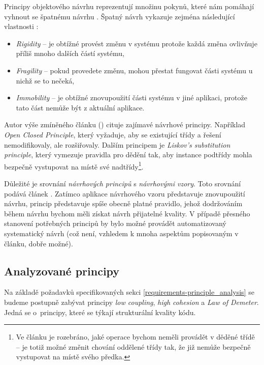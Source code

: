 Principy objektového návrhu reprezentují množinu pokynů, které nám pomáhají vyhnout se špatnému návrhu \cite{oop_design_principles}. Špatný návrh vykazuje zejména následující vlastnosti \cite{oop_design_principles_and_patterns}:

\begin{itemize}
\item \emph{Rigidity} -- je obtížné provést změnu v systému protože každá změna ovlivňuje příliš mnoho dalších částí systému,
\item \emph{Fragility} -- pokud provedete změnu, mohou přestat fungovat části systému u nichž se to nečeká,
\item \emph{Immobility} -- je obtížné znovupoužití části systému v jiné aplikaci, protože tato část nemůže být  z aktuální aplikace.
\end{itemize}

Autor výše zmíněného článku (\cite{oop_design_principles_and_patterns}) cituje zajímavé návrhové principy. Například \emph{Open Closed Principle}, který vyžaduje, aby se existující třídy a řešení nemodifikovaly, ale rozšiřovaly. Dalším principem je \emph{Liskov's substitution principle}, který vymezuje pravidla pro dědění tak, aby instance podtřídy mohla bezpečně vystupovat na místě své nadtřídy\footnote{Ve článku je rozebráno, jaké operace bychom neměli provádět v děděné třídě -- je totiž možné změnit chování oddělené třídy tak, že již nemůže bezpečně vystupovat na místě svého předka.}.

Důležité je srovnání \emph{návrhových principů} s \emph{návrhovými vzory}. Toto srovnání podává článek \cite{612257}. Zatímco aplikace návrhového vzoru představuje znovupoužití  návrhu, princip představuje spíše obecně platné pravidlo, jehož dodržováním během návrhu bychom měli získat návrh přijatelné kvality. V případě přesného stanovení potřebných principů by bylo možné provádět automatizovaný systematický návrh (což není, vzhledem k mnoha aspektům popisovaným v článku, dobře možné).

\subsection{Analyzované principy}
\label{analysis-principles_analyzed}
Na základě požadavků specifikovaných sekci \ref{requirements-principle_analysis} se budeme postupně zabývat principy \emph{low coupling}, \emph{high cohesion} a \emph{Law of Demeter}. Jedná se o~principy, které se týkají strukturální kvality kódu.

